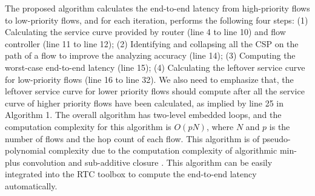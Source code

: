 \documentclass[10pt,journal]{IEEEtran}
\begin{document}
The proposed algorithm calculates the end-to-end latency from high-priority flows to low-priority flows, and for each iteration, performs the following four steps: (1) Calculating the service curve provided by router (line 4 to line 10) and flow controller (line 11 to line 12); (2) Identifying and collapsing all the CSP on the path of a flow to improve the analyzing accuracy (line 14); (3) Computing the worst-case end-to-end latency (line 15); (4) Calculating the leftover service curve for low-priority flows (line 16 to line 32). We also need to emphasize that, the leftover service curve for lower priority flows should compute after all the service curve of higher priority flows have been calculated, as implied by line 25 in Algorithm 1. The overall algorithm has two-level embedded loops, and the computation complexity for this algorithm is $O(pN)$, where $N$ and $p$ is the number of flows and the hop count of each flow. This algorithm is of pseudo-polynomial complexity due to the computation complexity of algorithmic min-plus convolution and sub-additive closure \cite{Bouillard2008}. This algorithm can be easily integrated into the RTC toolbox \cite{rtc} to compute the end-to-end latency automatically.
\end{document}

